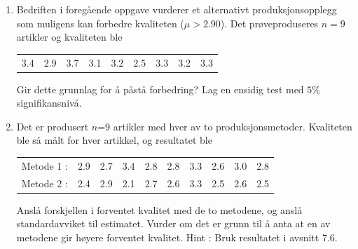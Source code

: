 \begin{enumerate}
\item     Bedriften i foregående oppgave vurderer et
          alternativt produksjonsopplegg som muligens kan
          forbedre kvaliteten ($\mu >2.90$). Det
          prøveproduseres $n=9$ artikler og kvaliteten ble
      \begin{center}
    \begin{tabular}{ccccccccc}
          3.4&2.9&3.7&3.1&3.2&2.5&3.3&3.2&3.3
    \end{tabular}
   \end{center}                                 
          Gir dette grunnlag for å påstå forbedring?
          Lag en ensidig test med $5\%$ signifikansnivå.

\item    Det er produsert $n$=9 artikler med hver av to produksjonsmetoder.
         Kvaliteten ble så målt for hver artikkel, og resultatet ble
   \begin{center}
    \begin{tabular}{lccccccccc}
    Metode 1 : &2.9&2.7&3.4&2.8&2.8&3.3&2.6&3.0&2.8\\
    Metode 2 : &2.4&2.9&2.1&2.7&2.6&3.3&2.5&2.6&2.5
    \end{tabular}
   \end{center}
         Anslå forskjellen i forventet kvalitet med de to metodene, og
         anslå standardavviket til estimatet.
         Vurder om det er grunn til å anta at en av metodene gir 
         høyere forventet kvalitet.
         Hint : Bruk resultatet i avsnitt 7.6.


\end{enumerate}
